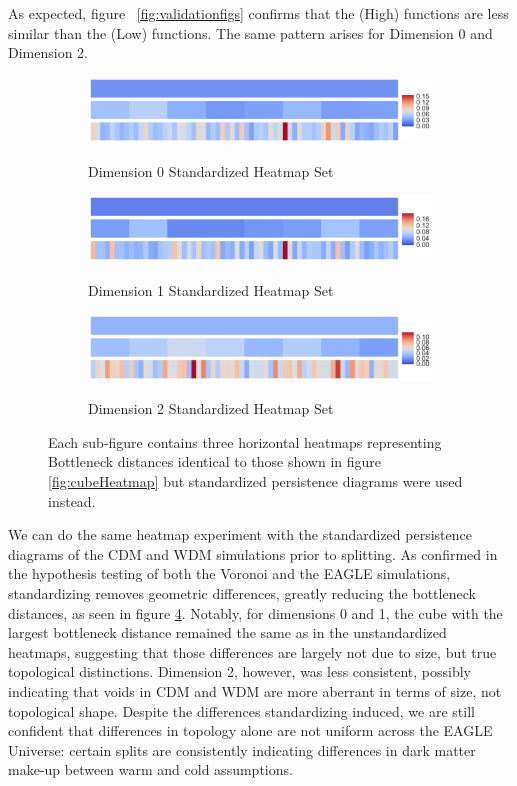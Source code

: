 \documentclass[12pt]{article}
\begin{document}
As expected, figure ~\ref{fig:validationfigs} confirms that the (High) functions are less similar than the (Low) functions. The same pattern arises for Dimension 0 and Dimension 2.  

\begin{figure}[htp!]
  \centering
    \begin{subfigure}{\textwidth}
    \centering
        \caption{Dimension 0 Standardized Heatmap Set}
        \includegraphics[width=0.6\linewidth]{hmap_dim0_yesnorm.pdf}
    \label{fig:cubeHeatmapStand0}
  \end{subfigure}
    \begin{subfigure}{\textwidth}
    \centering
        \caption{Dimension 1 Standardized Heatmap Set}
        \includegraphics[width=0.6\linewidth]{hmap_dim1_yesnorm.pdf}
    \label{fig:cubeHeatmapStand1}
  \end{subfigure}
    \begin{subfigure}{\textwidth}
    \centering
        \caption{Dimension 2 Standardized Heatmap Set}
        \includegraphics[width=0.6\linewidth]{hmap_dim2_yesnorm.pdf}
    \label{fig:cubeHeatmapStand2}
  \end{subfigure}
    \label{fig:StandCubeHeatmap}
    \caption{Each sub-figure contains three horizontal heatmaps representing Bottleneck distances identical to those shown in figure  \ref{fig:cubeHeatmap} but standardized persistence diagrams were used instead.}
\end{figure}

We can do the same heatmap experiment with the standardized persistence diagrams of the CDM and WDM simulations prior to splitting. As confirmed in the hypothesis testing of both the Voronoi and the EAGLE simulations, standardizing removes geometric differences, greatly reducing the bottleneck distances, as seen in figure  \ref{fig:StandCubeHeatmap}. Notably, for dimensions 0 and 1, the cube with the largest bottleneck distance remained the same as in the unstandardized heatmaps, suggesting that those differences are largely not due to size, but true topological distinctions. Dimension 2, however, was less consistent, possibly indicating that voids in CDM and WDM are more aberrant in terms of size, not topological shape. Despite the differences standardizing induced, we are still confident that differences in topology alone are not uniform across the EAGLE Universe: certain splits are consistently indicating differences in dark matter make-up between warm and cold assumptions.
\end{document}
